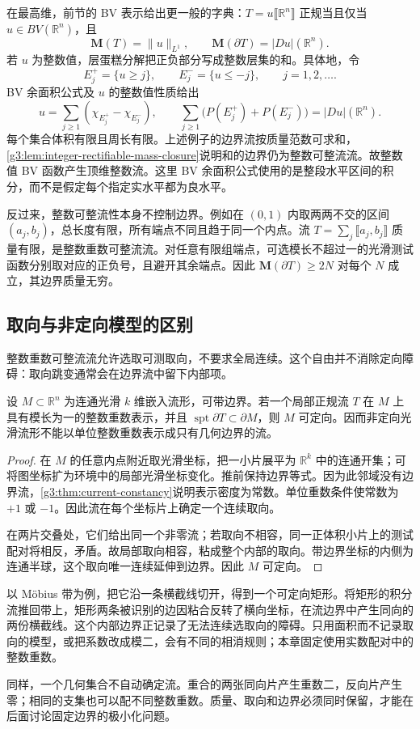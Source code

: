 在最高维，前节的 BV 表示给出更一般的字典：\(T=u\lBrack\mathbb R^n\rBrack\) 正规当且仅当 \(u\in BV(\mathbb R^n)\)，且
\[
	\mathbf M(T)=\|u\|_{L^1},\qquad \mathbf M(\partial T)=|Du|(\mathbb R^n).
\]
若 \(u\) 为整数值，层蛋糕分解把正负部分写成整数层集的和。具体地，令
\[
	E_j^+=\{u\ge j\},\qquad E_j^-=\{u\le-j\},\qquad j=1,2,\ldots.
\]
BV 余面积公式及 \(u\) 的整数值性质给出
\[
	u=\sum_{j\ge1}(\chi_{E_j^+}-\chi_{E_j^-}),\qquad
	\sum_{j\ge1}\bigl(P(E_j^+)+P(E_j^-)\bigr)=|Du|(\mathbb R^n).
\]
每个集合体积有限且周长有限。上述例子的边界流按质量范数可求和，\cref{g3:lem:integer-rectifiable-mass-closure}说明和的边界仍为整数可整流流。故整数值 BV 函数产生顶维整数流。这里 BV 余面积公式使用的是整段水平区间的积分，而不是假定每个指定实水平都为良水平。

反过来，整数可整流性本身不控制边界。例如在 \((0,1)\) 内取两两不交的区间 \((a_j,b_j)\)，总长度有限，所有端点不同且趋于同一个内点。流 \(T=\sum_j\lBrack a_j,b_j\rBrack\) 质量有限，是整数重数可整流流。对任意有限组端点，可选模长不超过一的光滑测试函数分别取对应的正负号，且避开其余端点。因此 \(\mathbf M(\partial T)\ge2N\) 对每个 \(N\) 成立，其边界质量无穷。

\subsection{取向与非定向模型的区别}
\label{g3:subsec:2202:04}
整数重数可整流流允许选取可测取向，不要求全局连续。这个自由并不消除定向障碍：取向跳变通常会在边界流中留下内部项。

\begin{proposition}\label{g3:prop:current-orientation-obstruction}
	设 \(M\subset\mathbb R^n\) 为连通光滑 \(k\) 维嵌入流形，可带边界。若一个局部正规流 \(T\) 在 \(M\) 上具有模长为一的整数重数表示，并且 \(\operatorname{spt}\partial T\subset\partial M\)，则 \(M\) 可定向。因而非定向光滑流形不能以单位整数重数表示成只有几何边界的流。
\end{proposition}
\begin{proof}
	在 \(M\) 的任意内点附近取光滑坐标，把一小片展平为 \(\mathbb R^k\) 中的连通开集；可将图坐标扩为环境中的局部光滑坐标变化。推前保持边界等式。因为此邻域没有边界流，\cref{g3:thm:current-constancy}说明表示密度为常数。单位重数条件使常数为 \(+1\) 或 \(-1\)。因此流在每个坐标片上确定一个连续取向。

	在两片交叠处，它们给出同一个非零流；若取向不相容，同一正体积小片上的测试配对将相反，矛盾。故局部取向相容，粘成整个内部的取向。带边界坐标的内侧为连通半球，这个取向唯一连续延伸到边界。因此 \(M\) 可定向。
\end{proof}

以 Möbius 带为例，把它沿一条横截线切开，得到一个可定向矩形。将矩形的积分流推回带上，矩形两条被识别的边因粘合反转了横向坐标，在流边界中产生同向的两份横截线。这个内部边界正记录了无法连续选取向的障碍。只用面积而不记录取向的模型，或把系数改成模二，会有不同的相消规则；本章固定使用实数配对中的整数重数。

同样，一个几何集合不自动确定流。重合的两张同向片产生重数二，反向片产生零；相同的支集也可以配不同整数重数。质量、取向和边界必须同时保留，才能在后面讨论固定边界的极小化问题。
